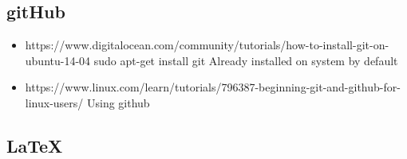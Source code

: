 \documentclass[12pt]{article}
\begin{document}
	\subsection{gitHub}
	\begin{itemize}
		\item https://www.digitalocean.com/community/tutorials/how-to-install-git-on-ubuntu-14-04
		\subitem sudo apt-get install git
		\subitem Already installed on system by default
		\item https://www.linux.com/learn/tutorials/796387-beginning-git-and-github-for-linux-users/
			\subitem Using github
	\end{itemize}
	\subsection{LaTeX}
\end{document}
